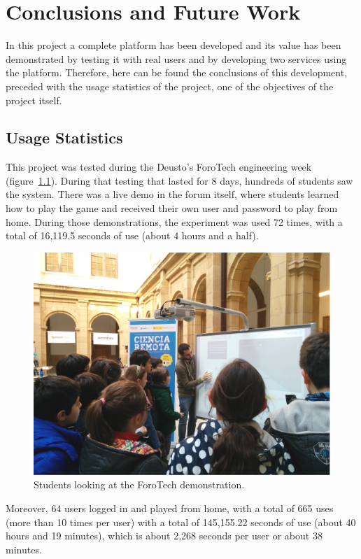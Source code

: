 \chapter{Conclusions and Future Work}

In this project a complete platform has been developed and its value has been demonstrated by
testing it with real users and by developing two services using the platform. Therefore, here can be
found the conclusions of this development, preceded with the usage statistics of the project, one of
the objectives of the project itself.

\section{Usage Statistics}

This project was tested during the Deusto's ForoTech engineering week (figure~\ref{fig:forotech}).
During that testing that lasted for 8 days, hundreds of students saw the system. There was a live
demo in the forum itself, where students learned how to play the game and received their own user
and password to play from home. During those demonstrations, the experiment was used 72 times, with
a total of 16,119.5 seconds of use (about 4 hours and a half).

\begin{figure}[ht]
	\centering
	\includegraphics[height=0.3\textheight]{fig/forotech.jpg}
	\caption{Students looking at the ForoTech demonstration.}
	\label{fig:forotech}
\end{figure}

Moreover, 64 users logged in and played from home, with a total of 665 uses (more than 10 times per
user) with a total of 145,155.22 seconds of use (about 40 hours and 19 minutes), which is about
2,268 seconds per user or about 38 minutes.

